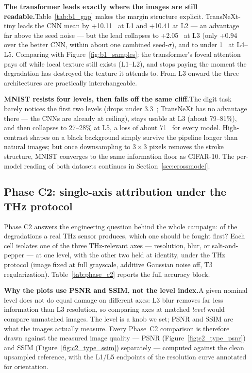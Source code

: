 \textbf{The transformer leads exactly where the images are still
readable.}\quad Table~\ref{tab:b1_gap} makes the margin structure explicit.
TransNeXt-tiny leads the CNN mean by +10.11~\Mpp{} at L1 and +10.41 at L2 ---
an advantage far above the seed noise --- but the lead collapses to
+2.05~\Mpp{} at L3 (only +0.94 over the better CNN, within about one
combined seed-$\sigma$), and to under 1~\Mpp{} at L4--L5. Comparing with
Figure~\ref{fig:b1_samples}: the transformer's foveal attention pays off
while local texture still exists (L1--L2), and stops paying the moment the
degradation has destroyed the texture it attends to. From L3 onward the
three architectures are practically interchangeable.

\textbf{MNIST resists four levels, then falls off the same cliff.}\quad The
digit task barely notices the first two levels (drops under 3.3~\Mpp{};
TransNeXt has no advantage there --- the CNNs are already at ceiling), stays
usable at L3 (about 79--81\%), and then collapses to 27--28\% at L5, a loss
of about 71~\Mpp{} for every model. High-contrast shapes on a black
background simply survive the pipeline longer than natural images; but once
downsampling to $3 \times 3$ pixels removes the stroke structure, MNIST
converges to the same information floor as CIFAR-10. The per-model reading
of both datasets continues in Section~\ref{sec:crossmodel}.

\subsection{Phase C2: single-axis attribution under the THz protocol}
\label{sec:tests:phase_c2}
Phase C2 answers the engineering question behind the whole campaign: of the
degradations a real THz sensor produces, which one should be fought first?
Each cell isolates one of the three THz-relevant axes --- resolution, blur,
or salt-and-pepper --- at one level, with the other two held at identity,
under the THz protocol (image fixed at full grayscale, additive Gaussian
noise off, T3 regularization). Table~\ref{tab:phase_c2} reports the full
accuracy block.



\textbf{Why the plots use PSNR and SSIM, not the level index.}\quad A given
nominal level does not do equal damage on different axes: L3 blur removes far
less information than L3 resolution, so comparing axes at matched
\emph{level} would compare unmatched images. The level is a knob we set; PSNR
and SSIM are what the images actually measure. Every Phase~C2 comparison is
therefore drawn against the measured image quality --- PSNR
(Figure~\ref{fig:c2_type_psnr}) and SSIM (Figure~\ref{fig:c2_type_ssim})
separately --- computed against the clean upsampled reference, with the
L1/L5 endpoints of the resolution curve annotated for orientation.

